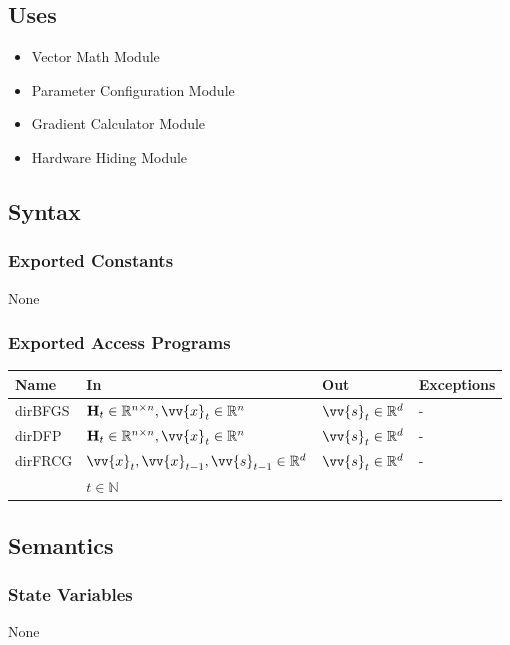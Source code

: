 \documentclass[12pt, titlepage]{article}
\begin{document}
\subsection{Uses}
\begin{itemize}
    \item Vector Math Module
    \item Parameter Configuration Module
    \item Gradient Calculator Module
    \item Hardware Hiding Module
\end{itemize}

\subsection{Syntax}

\subsubsection{Exported Constants}
None
\subsubsection{Exported Access Programs}

\begin{center}
\begin{tabular}{p{2cm} p{4cm} p{4cm} p{2cm}}
\hline
\textbf{Name} & \textbf{In} & \textbf{Out} & \textbf{Exceptions} \\
\hline
dirBFGS & $\mathbf{H}_t \in \mathbb{R}^{n \times n}, \vv{x}_{t} \in \mathbb{R}^{n}$ & $\vv{s}_{t} \in \mathbb{R}^d$ & - \\
dirDFP  & $\mathbf{H}_t \in \mathbb{R}^{n \times n}, \vv{x}_{t} \in \mathbb{R}^{n}  $ & $\vv{s}_{t} \in \mathbb{R}^d$ & - \\
dirFRCG & $\vv{x}_{t},\vv{x}_{t-1}, \vv{s}_{t-1} \in \mathbb{R}^d$ & $\vv{s}_{t} \in \mathbb{R}^d$ & - \\
& $t \in \mathbb{N}$ & & \\
\hline
\end{tabular}
\end{center}

\subsection{Semantics}
\subsubsection{State Variables}
None
\end{document}
